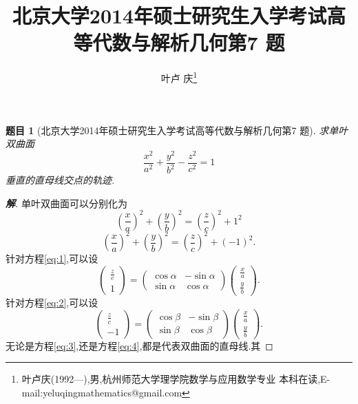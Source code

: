 \documentclass[a4paper]{article}
\newtheorem*{exe}{题目}
\newenvironment{exercise}
{\bigskip\begin{mdframed}\begin{exe}}
    {\end{exe}\end{mdframed}\bigskip}
\begin{document}
\title{\huge{\bf{北京大学2014年硕士研究生入学考试高等代数与解析几何第7
      题}}} \author{\small{叶卢
    庆\footnote{叶卢庆(1992---),男,杭州师范大学理学院数学与应用数学专业
      本科在读,E-mail:yeluqingmathematics@gmail.com}}}
\maketitle
\begin{exercise}[北京大学2014年硕士研究生入学考试高等代数与解析几何第7
  题]
求单叶双曲面
$$
\frac{x^2}{a^2}+\frac{y^2}{b^2}-\frac{z^2}{c^2}=1
$$
垂直的直母线交点的轨迹.  
\end{exercise}
\begin{proof}[\textbf{解}]
单叶双曲面可以分别化为
\begin{equation}\label{eq:1}
(\frac{x}{a})^2+(\frac{y}{b})^2=(\frac{z}{c})^2+1^2
\end{equation}
\begin{equation}
  \label{eq:2}
(\frac{x}{a})^2+(\frac{y}{b})^2=(\frac{z}{c})^2+(-1)^2.
\end{equation}
针对方程\eqref{eq:1},可以设
\begin{equation}
  \label{eq:3}
  \begin{pmatrix}
    \frac{z}{c}\\
1
  \end{pmatrix}=
  \begin{pmatrix}
    \cos\alpha&-\sin\alpha\\
\sin\alpha&\cos\alpha
  \end{pmatrix}
  \begin{pmatrix}
    \frac{x}{a}\\
\frac{y}{b}
  \end{pmatrix}.
\end{equation}
针对方程\eqref{eq:2},可以设
\begin{equation}
  \label{eq:4}
  \begin{pmatrix}
    \frac{z}{c}\\
-1
  \end{pmatrix}=
  \begin{pmatrix}
    \cos\beta&-\sin\beta\\
\sin\beta&\cos\beta
  \end{pmatrix}
  \begin{pmatrix}
    \frac{x}{a}\\
\frac{y}{b}
  \end{pmatrix}.
\end{equation}
无论是方程\eqref{eq:3},还是方程\eqref{eq:4},都是代表双曲面的直母线.其

\end{proof}
\end{document}
